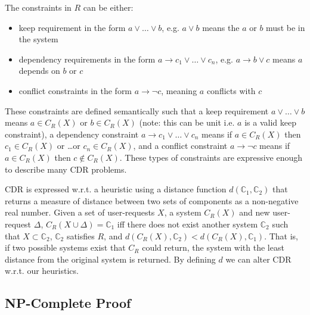 The constraints in $R$ can be either: 
\begin{itemize}
  \item keep requirement in the form $a \vee \ldots \vee b$, e.g. $a \vee b$ means the $a$ or $b$ must be in the system
  \item dependency requirements in the form $a \rightarrow c_1 \vee \ldots \vee c_n$, e.g. $a \rightarrow b \vee c$ means $a$ depends on $b$ or $c$
  \item conflict constraints in the form $a \rightarrow \neg c$, meaning $a$ conflicts with $c$
\end{itemize}
These constraints are defined semantically such that
a keep requirement  $a \vee \ldots \vee b$ means $a \in C_R(X)$ or $b \in C_R(X)$ (note: this can be unit i.e. $a$ is a valid keep constraint),
a dependency constraint $a \rightarrow c_1 \vee \ldots \vee c_n$ means if $a \in C_R(X)$ then $c_1 \in C_R(X)$ or \ldots or $c_n \in C_R(X)$,
and a conflict constraint $a \rightarrow \neg c$ means if $a \in C_R(X)$ then $c \not \in C_R(X)$.
These types of constraints are expressive enough to describe many CDR problems.

CDR is expressed w.r.t. a heuristic using a distance function $d(\mathbb{C}_1,\mathbb{C}_2)$ 
that returns a measure of distance between two sets of components as a non-negative real number.
Given a set of user-requests $X$, a system $C_R(X)$ and new user-request $\Delta$,
$C_R(X \cup \Delta) = \mathbb{C}_1$ iff there does not exist another system $\mathbb{C}_2$ such that $X \subset \mathbb{C}_2$, $\mathbb{C}_2$ satisfies $R$, 
and $d(C_R(X),\mathbb{C}_2) < d(C_R(X),\mathbb{C}_1)$.
That is, if two possible systems exist that $C_R$ could return, the system with the least distance from the original system is returned. 
By defining $d$ we can alter CDR w.r.t. our heuristics.


\subsection{NP-Complete Proof}

